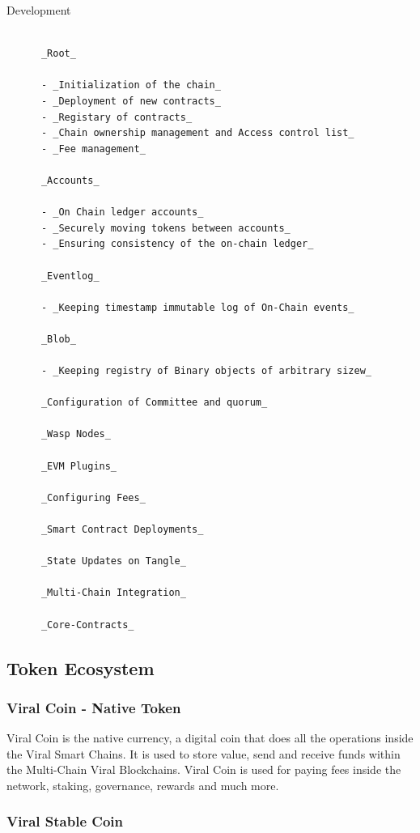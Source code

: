 \documentclass[10pt]{article}
\begin{document}
Development

\begin{lstlisting}

      _Root_

      - _Initialization of the chain_
      - _Deployment of new contracts_
      - _Registary of contracts_
      - _Chain ownership management and Access control list_
      - _Fee management_

      _Accounts_

      - _On Chain ledger accounts_
      - _Securely moving tokens between accounts_
      - _Ensuring consistency of the on-chain ledger_

      _Eventlog_

      - _Keeping timestamp immutable log of On-Chain events_

      _Blob_

      - _Keeping registry of Binary objects of arbitrary sizew_

      _Configuration of Committee and quorum_

      _Wasp Nodes_

      _EVM Plugins_

      _Configuring Fees_

      _Smart Contract Deployments_

      _State Updates on Tangle_

      _Multi-Chain Integration_

      _Core-Contracts_

\end{lstlisting}

\subsection{Token Ecosystem}

\subsubsection{Viral Coin - Native Token}

Viral Coin is the native currency, a digital coin that does all the operations inside the Viral Smart Chains. It is used to store value, send and receive funds within the Multi-Chain Viral Blockchains. Viral Coin is used for paying fees inside the network, staking, governance, rewards and much more.\\

\subsubsection{Viral Stable Coin}
\end{document}
